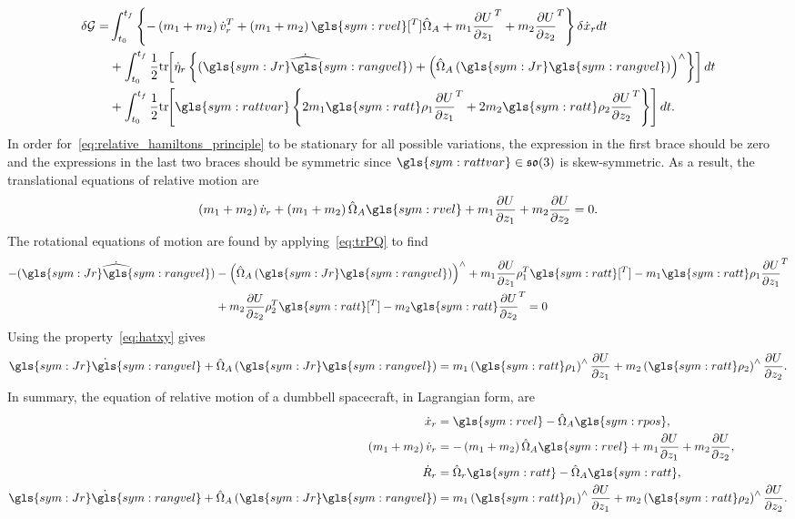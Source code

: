 \begin{align*}
    \delta \mathcal{G} =& \int_{t_0}^{t_f} \left\{-\parenth{m_1+m_2} \dot{v}_r^T + \parenth{m_1 + m_2} \gls{sym:rvel}[^T] \hat{\Omega}_A + m_1 \deriv{U}{z_1}^T + m_2 \deriv{U}{z_2}^T \right\}\delta \dot{x}_r  dt \nonumber\\
                        & +\int_{t_0}^{t_f} \frac{1}{2} \tr{\dot{\eta}_r \braces{\dot{\widehat{\parenth{\gls{sym:Jr} \gls{sym:rangvel}}}} + \parenth{\hat{\Omega}_A \parenth{\gls{sym:Jr}\gls{sym:rangvel}}}^\wedge }} dt \\
                        & + \int_{t_0}^{t_f}  \frac{1}{2} \tr{\gls{sym:rattvar} \braces{2 m_1\gls{sym:ratt}\rho_1\deriv{U}{z_1}^T + 2 m_2 \gls{sym:ratt}\rho_2\deriv{U}{z_2}^T}} dt.
\end{align*}
In order for~\cref{eq:relative_hamiltons_principle} to be stationary for all possible variations, the expression in the first brace should be zero and the expressions in the last two braces should be symmetric since \( \gls{sym:rattvar} \in \so \) is skew-symmetric.
As a result, the translational equations of relative motion are 
\begin{align}
    \parenth{m_1 + m_2} \dot{v}_r + \parenth{m_1 + m_2} \hat{\Omega}_A \gls{sym:rvel} + m_1 \deriv{U}{z_1} + m_2 \deriv{U}{z_2} = 0.
\end{align}
The rotational equations of motion are found by applying~\cref{eq:trPQ} to find
\begin{align}
    - \dot{\widehat{\parenth{\gls{sym:Jr} \gls{sym:rangvel}}}} &- \parenth{\hat{\Omega}_A \parenth{\gls{sym:Jr} \gls{sym:rangvel}}}^\wedge + m_1 \deriv{U}{z_1} \rho_1^T \gls{sym:ratt}[^T] - m_1 \gls{sym:ratt}\rho_1\deriv{U}{z_1}^T \nonumber \\
    &+ m_2 \deriv{U}{z_2} \rho_2^T \gls{sym:ratt}[^T] - m_2 \gls{sym:ratt} \deriv{U}{z_2}^T = 0
\end{align}
Using the property~\cref{eq:hatxy} gives
\begin{align}
    \dot{\gls{sym:Jr} \gls{sym:rangvel}} + \hat{\Omega}_A \parenth{\gls{sym:Jr} \gls{sym:rangvel}} = m_1 \parenth{\gls{sym:ratt} \rho_1}^\wedge \deriv{U}{z_1} + m_2 \parenth{\gls{sym:ratt} \rho_2}^\wedge \deriv{U}{z_2}.
\end{align}
In summary, the equation of relative motion of a dumbbell spacecraft, in Lagrangian form, are
\begin{align*}
    \dot{x}_r &= \gls{sym:rvel} - \hat{\Omega}_A \gls{sym:rpos}, \\
    \parenth{m_1 + m_2} \dot{v}_r  &= -\parenth{m_1 + m_2} \hat{\Omega}_A \gls{sym:rvel} + m_1 \deriv{U}{z_1} + m_2 \deriv{U}{z_2}, \\
    \dot{R}_r &= \hat{\Omega}_r \gls{sym:ratt} - \hat{\Omega}_A \gls{sym:ratt}, \\
    \dot{\gls{sym:Jr} \gls{sym:rangvel}} + \hat{\Omega}_A \parenth{\gls{sym:Jr} \gls{sym:rangvel}} &= m_1 \parenth{\gls{sym:ratt} \rho_1}^\wedge \deriv{U}{z_1} + m_2 \parenth{\gls{sym:ratt} \rho_2}^\wedge \deriv{U}{z_2}.
\end{align*}
